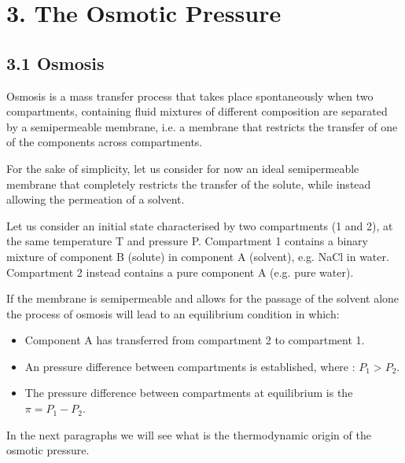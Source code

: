 \documentclass[letterpaper,10pt,english]{jupyterBook}
\begin{document}
\section{3. The Osmotic Pressure}
\label{\detokenize{Osmosis:the-osmotic-pressure}}\label{\detokenize{Osmosis::doc}}

\subsection{3.1 Osmosis}
\label{\detokenize{Osmosis:osmosis}}
\sphinxAtStartPar
Osmosis is a mass transfer process that takes place spontaneously when two compartments, containing fluid mixtures of different composition are separated by a semipermeable membrane, i.e. a membrane that restricts the transfer of one of the components across compartments.

\sphinxAtStartPar
For the sake of simplicity, let us consider for now an ideal semipermeable membrane that completely restricts the transfer of the solute, while instead allowing the permeation of a solvent.

\sphinxAtStartPar
Let us consider an initial state characterised by two compartments (1 and 2), at the same temperature T and pressure P.
Compartment 1 contains a binary mixture of component B (solute) in component A (solvent), e.g. NaCl in water. Compartment 2 instead contains a pure component A (e.g. pure water).

\sphinxAtStartPar
If the membrane is semipermeable and allows for the passage of the solvent alone the process of osmosis will lead to an equilibrium condition in which:
\begin{itemize}
\item {} 
\sphinxAtStartPar
Component A has transferred from compartment 2 to compartment 1.

\item {} 
\sphinxAtStartPar
An pressure difference between compartments is established, where : \(P_1>P_2\).

\item {} 
\sphinxAtStartPar
The pressure difference between compartments at equilibrium is the  \(\pi=P_1-P_2\).

\end{itemize}

\sphinxAtStartPar
In the next paragraphs we will see what is the thermodynamic origin of the osmotic pressure.
\end{document}
